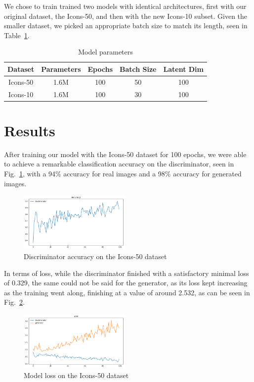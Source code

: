 \documentclass[conference]{IEEEtran}
\begin{document}
We chose to train trained two models with identical architectures, first with our original dataset, the Icons-50, and then with the new Icons-10 subset. Given the smaller dataset, we picked an appropriate batch size to match its length, seen in Table~\ref{tab:ModelParams}.

\begin{table}[htbp]
    \centering
    \caption{Model parameters}
    \begin{tabular}{ccccc}
    \hline
    \textbf{Dataset} & \textbf{Parameters} & \textbf{Epochs} & \textbf{Batch Size} & \textbf{Latent Dim} \\ \hline
    Icons-50 & 1.6M & 100 & 50 & 100 \\
    Icons-10 & 1.6M & 100 & 30 & 100 \\ \hline
    \end{tabular}
    \label{tab:ModelParams}
\end{table}

\section{Results}

After training our model with the Icons-50 dataset for 100 epochs, we were able to achieve a remarkable classification accuracy on the discriminator, seen in Fig.~\ref{fig:Icons50Acc}, with a 94\% accuracy for real images and a 98\% accuracy for generated images.

\begin{figure}[htbp]
    \centering
    \includegraphics[width=0.48\textwidth]{paper/images/icons50/icons50_acc.png}
    \caption{Discriminator accuracy on the Icons-50 dataset}
    \label{fig:Icons50Acc}
\end{figure}

In terms of loss, while the discriminator finished with a satisfactory minimal loss of 0.329, the same could not be said for the generator, as its loss kept increasing as the training went along, finishing at a value of around 2.532, as can be seen in Fig.~\ref{fig:Icons50Loss}.

\begin{figure}[htbp]
    \centering
    \includegraphics[width=0.48\textwidth]{paper/images/icons50/icons50_loss.png}
    \caption{Model loss on the Icons-50 dataset}
    \label{fig:Icons50Loss}
\end{figure}
\end{document}
